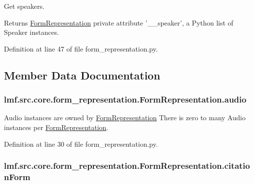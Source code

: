 Get speakers. 

\begin{DoxyReturn}{Returns}
\hyperlink{classlmf_1_1src_1_1core_1_1form__representation_1_1_form_representation}{Form\+Representation} private attribute '\+\_\+\+\_\+speaker', a Python list of Speaker instances. 
\end{DoxyReturn}


Definition at line 47 of file form\+\_\+representation.\+py.



\subsection{Member Data Documentation}
\hypertarget{classlmf_1_1src_1_1core_1_1form__representation_1_1_form_representation_ac13f0605619b9bdc6b921ae19b39c068}{
\subsubsection[{audio}]{\setlength{\rightskip}{0pt plus 5cm}lmf.\+src.\+core.\+form\+\_\+representation.\+Form\+Representation.\+audio}}\label{classlmf_1_1src_1_1core_1_1form__representation_1_1_form_representation_ac13f0605619b9bdc6b921ae19b39c068}


Audio instances are owned by \hyperlink{classlmf_1_1src_1_1core_1_1form__representation_1_1_form_representation}{Form\+Representation} There is zero to many Audio instances per \hyperlink{classlmf_1_1src_1_1core_1_1form__representation_1_1_form_representation}{Form\+Representation}. 



Definition at line 30 of file form\+\_\+representation.\+py.

\hypertarget{classlmf_1_1src_1_1core_1_1form__representation_1_1_form_representation_a70151ff258dea274006e4976818847a3}{
\subsubsection[{citation\+Form}]{\setlength{\rightskip}{0pt plus 5cm}lmf.\+src.\+core.\+form\+\_\+representation.\+Form\+Representation.\+citation\+Form}}\label{classlmf_1_1src_1_1core_1_1form__representation_1_1_form_representation_a70151ff258dea274006e4976818847a3}


